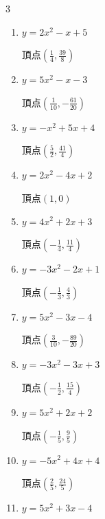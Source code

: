 \begin{multicols}{3}
\begin{enumerate}
        $\displaystyle 頂点\left( \frac{1}{8} , \frac{15}{16} \right)$

  \item $\displaystyle y=2x^{2}-x+5$

        $\displaystyle 頂点\left( \frac{1}{4} , \frac{39}{8} \right)$

  \item $\displaystyle y=5x^{2}-x-3$

        $\displaystyle 頂点\left( \frac{1}{10} , -\frac{61}{20} \right)$

  \item $\displaystyle y=-x^{2}+5x+4$

        $\displaystyle 頂点\left( \frac{5}{2} , \frac{41}{4} \right)$

\columnbreak %

  \item $\displaystyle y=2x^{2}-4x+2$

        $\displaystyle 頂点\left( 1 , 0 \right)$

  \item $\displaystyle y=4x^{2}+2x+3$

        $\displaystyle 頂点\left( -\frac{1}{4} , \frac{11}{4} \right)$

  \item $\displaystyle y=-3x^{2}-2x+1$

        $\displaystyle 頂点\left( -\frac{1}{3} , \frac{4}{3} \right)$

  \item $\displaystyle y=5x^{2}-3x-4$

        $\displaystyle 頂点\left( \frac{3}{10} , -\frac{89}{20} \right)$

  \item $\displaystyle y=-3x^{2}-3x+3$

        $\displaystyle 頂点\left( -\frac{1}{2} , \frac{15}{4} \right)$

\columnbreak %

  \item $\displaystyle y=5x^{2}+2x+2$

        $\displaystyle 頂点\left( -\frac{1}{5} , \frac{9}{5} \right)$

  \item $\displaystyle y=-5x^{2}+4x+4$

        $\displaystyle 頂点\left( \frac{2}{5} , \frac{24}{5} \right)$

  \item $\displaystyle y=5x^{2}+3x-4$


\end{enumerate}
\end{multicols}
